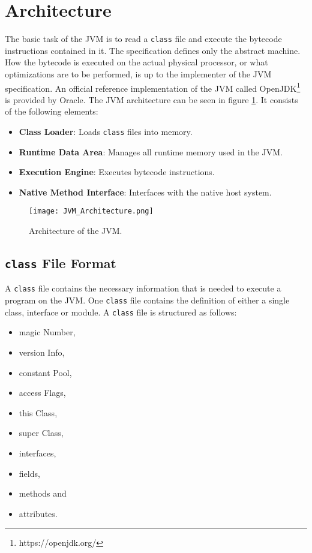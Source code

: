 \section{Architecture}

The basic task of the JVM is to read a \texttt{class} file and execute the bytecode instructions contained in it. The specification defines only the abstract machine. How the bytecode is executed on the actual physical processor, or what optimizations are to be performed, is up to the implementer of the JVM specification. An official reference implementation of the JVM called OpenJDK\footnote{https://openjdk.org/} is provided by Oracle. 
The JVM architecture can be seen in figure \ref{fig:JVMArchitecture}. It consists of the following elements: 

\begin{itemize}
    \item \textbf{Class Loader}: Loads \texttt{class} files into memory.
    \item \textbf{Runtime Data Area}: Manages all runtime memory used in the JVM.
    \item \textbf{Execution Engine}: Executes bytecode instructions.
    \item \textbf{Native Method Interface}: Interfaces with the native host system. 
\end{itemize}

\begin{figure}[]
    \centering
    \texttt{[image: JVM\_Architecture.png]}
    \caption{Architecture of the JVM.}
    \label{fig:JVMArchitecture}
\end{figure}

\subsection{\texttt{class} File Format}

A \texttt{class} file contains the necessary information that is needed to execute a program on the JVM. One \texttt{class} file contains the definition of either a single class, interface or module. A \texttt{class} file is structured as follows: 

\begin{itemize}
    \item magic Number,
    \item version Info,
    \item constant Pool,
    \item access Flags,
    \item this Class,
    \item super Class,
    \item interfaces,
    \item fields,
    \item methods and
    \item attributes.
\end{itemize}

